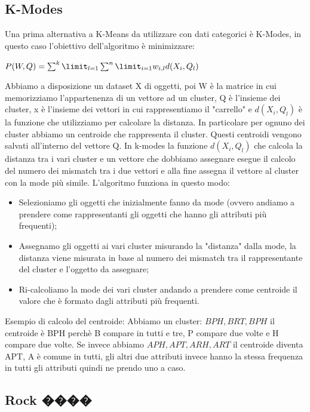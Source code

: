 \documentclass[14pt]{extreport}
\begin{document}
\subsection{K-Modes}

Una prima alternativa a K-Means da utilizzare con dati categorici è K-Modes, in questo caso l'obiettivo dell'algoritmo è minimizzare:
\newline
\centerline{$P(W,Q)=\sum^k \limit_{l=1} \sum^n \limit_{i=1} w_{i,l}d(X_i,Q_l)$}
Abbiamo a disposizione un dataset X di oggetti, poi W è la matrice in cui memorizziamo l'appartenenza di un vettore ad un cluster, Q è l'insieme dei cluster, x è l'insieme dei vettori in cui rappresentiamo il "carrello" e $d(X_i,Q_l)$ è la funzione che utilizziamo per calcolare la distanza.
In particolare per ognuno dei cluster abbiamo un centroide che rappresenta il cluster. Questi centroidi vengono salvati all'interno del vettore Q.
In k-modes la funzione $d(X_i,Q_l)$ che calcola la distanza tra i vari cluster e un vettore che dobbiamo assegnare esegue il calcolo del numero dei mismatch tra i due vettori e alla fine assegna il vettore al cluster con la mode più simile.
L'algoritmo funziona in questo modo:
\begin{itemize}
    \item Selezioniamo gli oggetti che inizialmente fanno da mode (ovvero andiamo a prendere come rappresentanti gli oggetti che hanno gli attributi più frequenti);
    \item Assegnamo gli oggetti ai vari cluster misurando la "distanza" dalla mode, la distanza viene misurata in base al numero dei mismatch tra il rappresentante del cluster e l'oggetto da assegnare;
    \item Ri-calcoliamo la mode dei vari cluster andando a prendere come centroide il valore che è formato dagli attributi più frequenti.
\end{itemize}

Esempio di calcolo del centroide:
Abbiamo un cluster: ${BPH,BRT,BPH}$ il centroide è BPH perchè B compare in tutti e tre, P compare due volte e H compare due volte.
Se invece abbiamo ${APH,APT,ARH,ART}$ il centroide diventa APT, A è comune in tutti, gli altri due attributi invece hanno la stessa frequenza in tutti gli attributi quindi ne prendo uno a caso.

\subsection{Rock ����}
\end{document}
